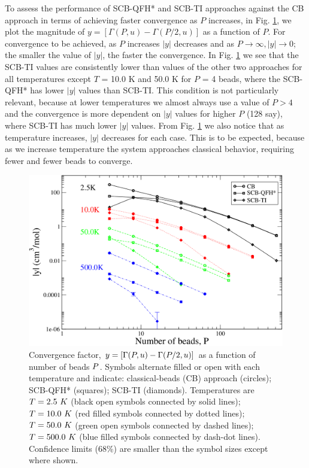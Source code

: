     To assess the performance of SCB-QFH* and SCB-TI approaches against the CB approach in terms of achieving faster convergence as $P$ increases, in Fig. \ref{shMag}, we plot the magnitude of $y = [\Gamma(P,u) - \Gamma(P/2,u)]$ as a function of $P$. For convergence to be achieved, as $P$ increases $|y|$ decreases and as $P \to \infty, |y| \to 0$; the smaller the value of $|y|$, the faster the convergence. In Fig. \ref{shMag} we see that the SCB-TI values are consistently lower than values of the other two approaches for all temperatures except $T$ = 10.0 K and 50.0 K for $P$ = 4 beads, where the SCB-QFH* has lower $|y|$ values than SCB-TI. This condition is not particularly relevant, because at lower temperatures we almost always use a value of $P > 4$ and the convergence is more dependent on $|y|$ values for higher $P$ (128 say), where SCB-TI has much lower $|y|$ values. From Fig. \ref{shMag} we also notice that as temperature increases, $|y|$ decreases for each case. This is to be expected, because as we increase temperature the system approaches classical behavior, requiring fewer and fewer beads to converge.
    \begin{figure}
        \centering
        \includegraphics[scale=0.3,keepaspectratio]{Chapter-3/Figures/shMagVsP.png}
        \caption{Convergence factor, $\protect y = [\Gamma(P,u) - \Gamma(P/2,u)]$ as a function of number of beads $\protect P$. Symbols alternate filled or open with each temperature and indicate: classical-beads (CB) approach (circles); SCB-QFH* (squares); SCB-TI (diamonds). Temperatures are $\protect T = 2.5~K$ (black open symbols connected by solid lines); $\protect T = 10.0~K$ (red filled symbols connected by dotted lines); $\protect T = 50.0~K$ (green open symbols connected by dashed lines); $\protect T = 500.0~K$ (blue filled symbols connected by dash-dot lines). Confidence limits (68\%) are smaller than the symbol sizes except where shown.} \label{shMag}
    \end{figure}

